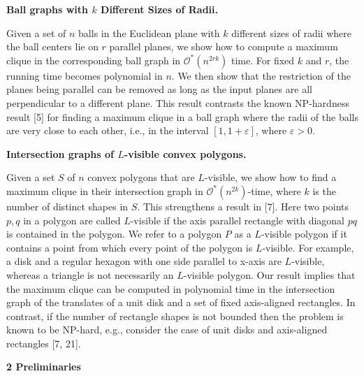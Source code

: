 \documentclass[10pt,a4paper]{amsart}
\begin{document}
\par
\par
\par
\par\medskip\noindent\textbf{Ball graphs with $k$ Different Sizes of Radii.}\par
Given a set of $n$ balls in the Euclidean plane with $k$ different sizes of radii where the ball centers lie on $r$ parallel planes, we show how to compute a maximum clique in the corresponding ball graph in $\mathcal{O}^{*}(n^{2rk})$ time. For fixed $k$ and $r$, the running time becomes polynomial in $n$. We then show that the restriction of the planes being parallel can be removed as long as the input planes are all perpendicular to a different plane. This result contrasts the known NP-hardness result [5] for finding a maximum clique in a ball graph where the radii of the balls are very close to each other, i.e., in the interval $[1,1+\varepsilon]$, where $\varepsilon>0$.
\par
\par
\par
\par\medskip\noindent\textbf{Intersection graphs of $L$-visible convex polygons.}\par
Given a set $S$ of $n$ convex polygons that are $L$-visible, we show how to find a maximum clique in their intersection graph in $\mathcal{O}^{*}(n^{2k})$-time, where $k$ is the number of distinct shapes in $S$. This strengthens a result in [7]. Here two points $p,q$ in a polygon are called $L$-visible if the axis parallel rectangle with diagonal $pq$ is contained in the polygon. We refer to a polygon $P$ as a $L$-visible polygon if it contains a point from which every point of the polygon is $L$-visible. For example, a disk and a regular hexagon with one side parallel to x-axis are $L$-visible, whereas a triangle is not necessarily an $L$-visible polygon. Our result implies that the maximum clique can be computed in polynomial time in the intersection graph of the translates of a unit disk and a set of fixed axis-aligned rectangles. In contrast, if the number of rectangle shapes is not bounded then the problem is known to be NP-hard, e.g., consider the case of unit disks and axis-aligned rectangles [7, 21].
\par
\par
\par
\par
\par\medskip\noindent\textbf{2 Preliminaries}\par
\end{document}

